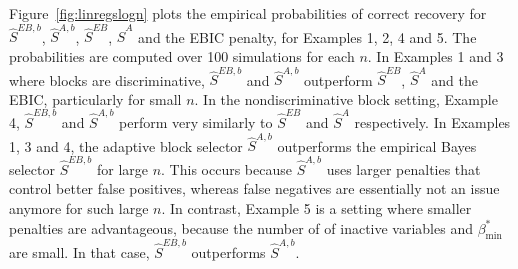 \documentclass[bj,authoryear]{imsart}
\theoremstyle{plain}
\begin{document}

Figure~\ref{fig:linregslogn} plots the empirical probabilities of correct recovery for $\hat S^{EB,b}$, $\hat S^{A,b}$, $\hat S^{EB}$, $\hat S^{A}$ and the EBIC penalty, for Examples 1, 2, 4 and 5. The probabilities are computed over 100 simulations for each $n$.
In Examples 1 and 3 where blocks are discriminative,
$\hat S^{EB,b}$ and $\hat S^{A,b}$ outperform $\hat S^{EB}$, $\hat S^{A}$ and the EBIC, particularly for small $n$. %
In the nondiscriminative block setting, Example 4, $\hat S^{EB,b}$ and $\hat S^{A,b}$ perform very similarly to  $\hat S^{EB}$ and $\hat S^{A}$ respectively. In Examples 1, 3 and 4, the adaptive block selector $\hat S^{A,b}$ outperforms the empirical Bayes selector $\hat S^{EB,b}$ for large $n$. This occurs because $\hat{S}^{A,b}$ uses larger penalties
that control better false positives, whereas false negatives are essentially not an issue anymore for such large $n$. In contrast, Example 5 is a setting where smaller penalties are advantageous, because the number of of inactive variables and $\beta_{\min}^*$ are small. In that case,  $\hat S^{EB,b}$ outperforms $\hat S^{A,b}$.
\end{document}
